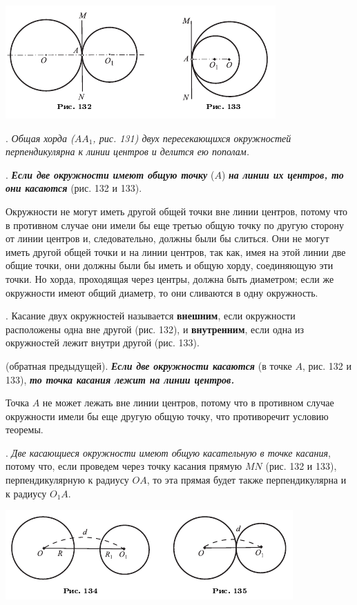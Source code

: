 \documentclass[oneside]{book}
\begin{document}
\includegraphics{pics/ris-132-133}

.
\emph{Общая хорда \emph{($AA_1$, рис. 131)} двух пересекающихся окружностей перпендикулярна к линии центров и делится ею пополам.}

.
\textbf{\emph{Если две окружности имеют общую точку}} ($A$) \textbf{\emph{на линии их центров, то они касаются}} (рис. 132 и 133).

Окружности не могут иметь другой общей точки вне линии центров, потому что в противном случае они имели бы еще третью общую точку по другую сторону от линии центров и, следовательно, должны были бы слиться.
Они не могут иметь другой общей точки и на линии центров, так как, имея на этой линии две общие точки, они должны были бы иметь и общую хорду, соединяющую эти точки.
Но хорда, проходящая через центры, должна быть диаметром;
если же окружности имеют общий диаметр, то они сливаются в одну окружность.

.
Касание двух окружностей называется \textbf{внешним}, если окружности расположены одна вне другой (рис. 132), и \textbf{внутренним}, если одна из окружностей лежит внутри другой (рис. 133).

 (обратная предыдущей).
\textbf{\emph{Если две окружности касаются}} (в точке $A$, рис. 132 и 133), \textbf{\emph{то точка касания лежит на линии центров.}}

Точка $A$ не может лежать вне линии центров, потому что в противном случае окружности имели бы еще другую общую точку, что противоречит условию теоремы.

.
\emph{Две касающиеся окружности имеют общую касательную в точке касания}, потому что, если проведем через точку касания прямую $MN$ (рис. 132 и 133), перпендикулярную к радиусу $OA$, то эта прямая будет также перпендикулярна и к радиусу $O_1A$.

\includegraphics{pics/ris-134-135}
\end{document}
